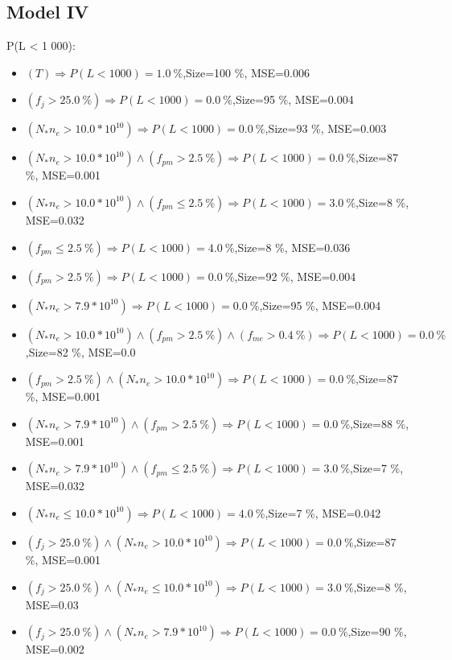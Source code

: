 \documentclass[numbered]{CSL}
\begin{document}
\subsection{Model IV}
P(L < 1 000):
\begin{itemize}
\item $(T) \Rightarrow P(L < 1 000) = 1.0~\%$,\hfill Size=100 \%, MSE=0.006
\item $(f_j > 25.0~\%) \Rightarrow P(L < 1 000) = 0.0~\%$,\hfill Size=95 \%, MSE=0.004
\item $(N_* n_e > 10.0 * 10^{10}) \Rightarrow P(L < 1 000) = 0.0~\%$,\hfill Size=93 \%, MSE=0.003
\item $(N_* n_e > 10.0 * 10^{10}) \land (f_{pm} > 2.5~\%) \Rightarrow P(L < 1 000) = 0.0~\%$,\hfill Size=87 \%, MSE=0.001
\item $(N_* n_e > 10.0 * 10^{10}) \land (f_{pm} \leq 2.5~\%) \Rightarrow P(L < 1 000) = 3.0~\%$,\hfill Size=8 \%, MSE=0.032
\item $(f_{pm} \leq 2.5~\%) \Rightarrow P(L < 1 000) = 4.0~\%$,\hfill Size=8 \%, MSE=0.036
\item $(f_{pm} > 2.5~\%) \Rightarrow P(L < 1 000) = 0.0~\%$,\hfill Size=92 \%, MSE=0.004
\item $(N_* n_e > 7.9 * 10^{10}) \Rightarrow P(L < 1 000) = 0.0~\%$,\hfill Size=95 \%, MSE=0.004
\item $(N_* n_e > 10.0 * 10^{10}) \land (f_{pm} > 2.5~\%) \land (f_{me} > 0.4~\%) \Rightarrow P(L < 1 000) = 0.0~\%$,\hfill Size=82 \%, MSE=0.0
\item $(f_{pm} > 2.5~\%) \land (N_* n_e > 10.0 * 10^{10}) \Rightarrow P(L < 1 000) = 0.0~\%$,\hfill Size=87 \%, MSE=0.001
\item $(N_* n_e > 7.9 * 10^{10}) \land (f_{pm} > 2.5~\%) \Rightarrow P(L < 1 000) = 0.0~\%$,\hfill Size=88 \%, MSE=0.001
\item $(N_* n_e > 7.9 * 10^{10}) \land (f_{pm} \leq 2.5~\%) \Rightarrow P(L < 1 000) = 3.0~\%$,\hfill Size=7 \%, MSE=0.032
\item $(N_* n_e \leq 10.0 * 10^{10}) \Rightarrow P(L < 1 000) = 4.0~\%$,\hfill Size=7 \%, MSE=0.042
\item $(f_j > 25.0~\%) \land (N_* n_e > 10.0 * 10^{10}) \Rightarrow P(L < 1 000) = 0.0~\%$,\hfill Size=87 \%, MSE=0.001
\item $(f_j > 25.0~\%) \land (N_* n_e \leq 10.0 * 10^{10}) \Rightarrow P(L < 1 000) = 3.0~\%$,\hfill Size=8 \%, MSE=0.03
\item $(f_j > 25.0~\%) \land (N_* n_e > 7.9 * 10^{10}) \Rightarrow P(L < 1 000) = 0.0~\%$,\hfill Size=90 \%, MSE=0.002

\end{itemize}
\end{document}
